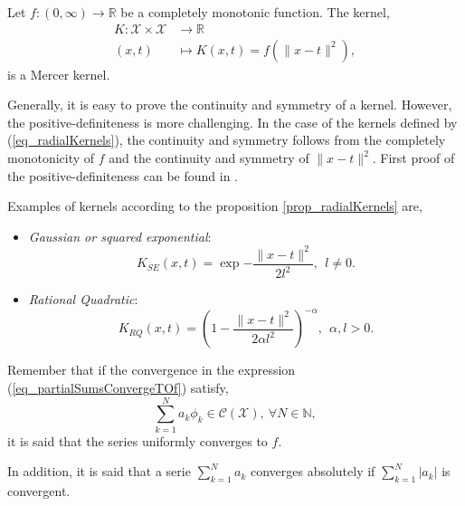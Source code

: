 \begin{proposition} \label{prop_radialKernels}
  Let $f: (0,\infty) \to \mathbb{R}$ be a completely monotonic function. The kernel,
  \begin{equation} \label{eq_radialKernels}
    \begin{aligned}
      K : \mathcal{X} \times \mathcal{X} &\to     \mathbb{R} \\
      (x,t)          &\mapsto K(x,t) = f(\|x-t\|^2),
    \end{aligned}
  \end{equation}
  is a Mercer kernel.
\end{proposition}

Generally, it is easy to prove the continuity and symmetry of a kernel. However, the positive-definiteness is more challenging. In the case of the kernels defined by (\ref{eq_radialKernels}), the continuity and symmetry follows from the completely monotonicity of $f$ and the continuity and symmetry of $\|x-t\|^2$. First proof of the positive-definiteness can be found in \textcite{schoenberg1988}.

Examples of kernels according to the proposition \ref{prop_radialKernels} are,
\begin{itemize}
  \item \emph{Gaussian or squared exponential}:
    \begin{equation} \label{eq_SExpKernel}
      K_{SE}(x,t) = \exp{-\frac{\|x-t\|^2}{2l^2}}, \ \ l \neq 0. 
    \end{equation}
  \item \emph{Rational Quadratic}:
    \begin{equation*}
      K_{RQ}(x,t) = \left(1-\frac{\|x-t\|^2}{2 \alpha l^2} \right)^{-\alpha}, \ \ \alpha, l > 0. 
    \end{equation*} 
\end{itemize}

Remember that if the convergence in the expression (\ref{eq_partialSumsConvergeTOf}) satisfy,
\begin{equation*}
  \sum_{k=1}^{N} a_k \phi_k \in \mathcal{C}(\mathcal{X}), \ \forall N \in \mathbb{N},
\end{equation*}
it is said that the series uniformly converges to $f$.

In addition, it is said that a serie $\sum_{k=1}^{N} a_k$ converges absolutely if $\sum_{k=1}^{N} |a_k|$ is convergent.

